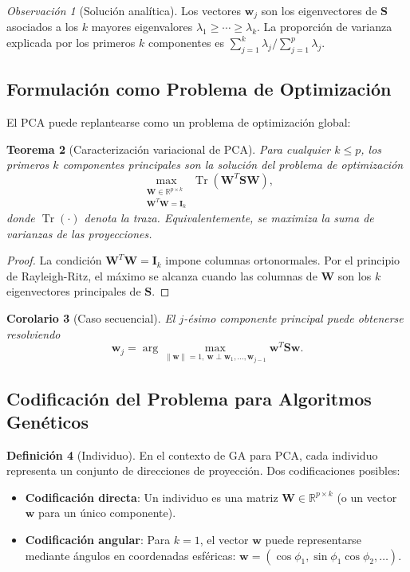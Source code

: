 \documentclass[11pt,a4paper]{article}
\theoremstyle{plain}
\newtheorem{theorem}{Teorema}[section]
\newtheorem{corollary}[theorem]{Corolario}
\theoremstyle{definition}
\newtheorem{definition}[theorem]{Definición}
\theoremstyle{remark}
\newtheorem{remark}[theorem]{Observación}
\newcommand{\1}{\mathbf{1}}
\begin{document}
\begin{remark}[Solución analítica]
Los vectores $\mathbf{w}_j$ son los eigenvectores de $\mathbf{S}$ asociados a los $k$ mayores eigenvalores $\lambda_1 \geq \cdots \geq \lambda_k$. La proporción de varianza explicada por los primeros $k$ componentes es $\sum_{j=1}^k \lambda_j / \sum_{j=1}^p \lambda_j$.
\end{remark}

\subsection{Formulación como Problema de Optimización}

El PCA puede replantearse como un problema de optimización global:

\begin{theorem}[Caracterización variacional de PCA]
\label{thm:pca_variational}
Para cualquier $k \leq p$, los primeros $k$ componentes principales son la solución del problema de optimización
\[
\max_{\substack{\mathbf{W} \in \mathbb{R}^{p \times k} \\ \mathbf{W}^T\mathbf{W}=\mathbf{I}_k}} \operatorname{Tr}(\mathbf{W}^T \mathbf{S} \mathbf{W}),
\]
donde $\operatorname{Tr}(\cdot)$ denota la traza. Equivalentemente, se maximiza la suma de varianzas de las proyecciones.
\end{theorem}

\begin{proof}
La condición $\mathbf{W}^T\mathbf{W}=\mathbf{I}_k$ impone columnas ortonormales. Por el principio de Rayleigh-Ritz, el máximo se alcanza cuando las columnas de $\mathbf{W}$ son los $k$ eigenvectores principales de $\mathbf{S}$.
\end{proof}

\begin{corollary}[Caso secuencial]
El $j$-ésimo componente principal puede obtenerse resolviendo
\[
\mathbf{w}_j = \arg\max_{\|\mathbf{w}\|=1,\ \mathbf{w} \perp \mathbf{w}_1,\ldots,\mathbf{w}_{j-1}} \mathbf{w}^T \mathbf{S} \mathbf{w}.
\]
\end{corollary}

\subsection{Codificación del Problema para Algoritmos Genéticos}

\begin{definition}[Individuo]
En el contexto de GA para PCA, cada individuo representa un conjunto de direcciones de proyección. Dos codificaciones posibles:
\begin{itemize}
\item \textbf{Codificación directa}: Un individuo es una matriz $\mathbf{W} \in \mathbb{R}^{p \times k}$ (o un vector $\mathbf{w}$ para un único componente).
\item \textbf{Codificación angular}: Para $k=1$, el vector $\mathbf{w}$ puede representarse mediante ángulos en coordenadas esféricas: $\mathbf{w} = (\cos\phi_1, \sin\phi_1\cos\phi_2, \ldots)$.
\end{itemize}
\end{definition}
\end{document}
